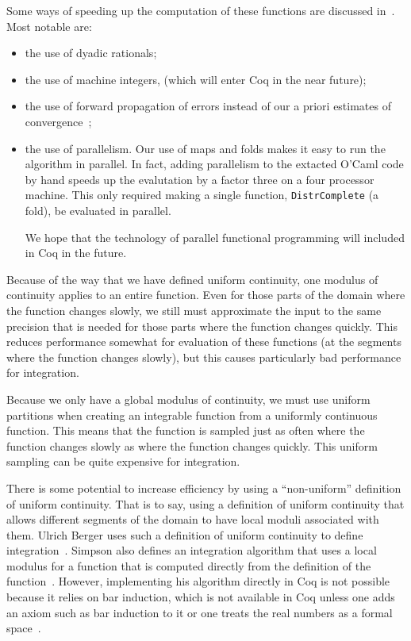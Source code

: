 \documentclass{elsarticle}
\newcommand{\uc}{uniformly continuous}
\begin{document}
Some ways of speeding up the computation of these functions are discussed
in~{\cite{OConnor:real}}. Most notable are:
\begin{itemize}
  \item the use of dyadic rationals;
  
  \item the use of machine integers, (which will enter Coq in the near
  future);
  
  \item the use of forward propagation of errors instead of our a priori
  estimates of convergence~{\cite{BauerKavkler}};
  
  \item the use of parallelism. Our use of maps and folds makes it easy to run
  the algorithm in parallel. In fact, adding parallelism to the extacted
  O'Caml code by hand speeds up the evalutation by a factor three on a four
  processor machine. This only required making a single function,
  {\texttt{DistrComplete}} (a fold), be evaluated in parallel.
  
  We hope that the technology of parallel functional programming will
  included in Coq in the future.
\end{itemize}
Because of the way that we have defined uniform continuity, one modulus of
continuity applies to an entire function. Even for those parts of the domain
where the function changes slowly, we still must approximate the input to the
same precision that is needed for those parts where the function changes
quickly. This reduces performance somewhat for evaluation of these functions
(at the segments where the function changes slowly), but this causes
particularly bad performance for integration.

Because we only have a global modulus of continuity, we must use uniform
partitions when creating an integrable function from a {\uc} function. This
means that the function is sampled just as often where the function changes
slowly as where the function changes quickly. This uniform sampling can be
quite expensive for integration.

There is some potential to increase efficiency by using a ``non-uniform''
definition of uniform continuity. That is to say, using a definition of
uniform continuity that allows different segments of the domain to have local
moduli associated with them. Ulrich Berger uses such a definition of uniform
continuity to define integration~{\cite{berger:2009}}. Simpson also defines an
integration algorithm that uses a local modulus for a function that is
computed directly from the definition of the function~{\cite{simpson:1998}}.
However, implementing his algorithm directly in Coq is not possible because it
relies on bar induction, which is not available in Coq
unless one adds an axiom such as bar induction to it or one treats the real
numbers as a formal space~{\cite{Sambin:1987}}{\cite{Bauer}}.
\end{document}
